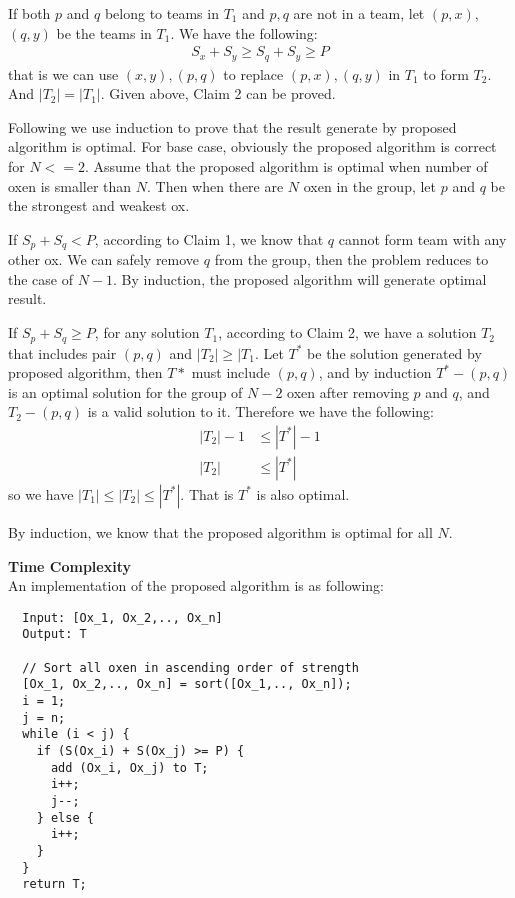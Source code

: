 \documentclass{article}
\newcommand{\Complexity}{\vspace{0.3cm} \noindent\textbf{Time Complexity} \\}
\begin{document}
If both $p$ and $q$ belong to teams in $T_1$ and $p, q$ are not in a team, let $(p, x)$, $(q, y)$ be
the teams in $T_1$. We have the following:
\begin{align}
  S_x + S_y \geq S_q + S_y \geq P 
\end{align}
that is we can use $(x, y), (p, q)$ to replace $(p, x), (q, y)$ in $T_1$ to form $T_2$. And $|T_2| =
|T_1|$.
Given above, Claim 2 can be proved.

\vspace{0.3cm}
Following we use induction to prove that the result generate by proposed algorithm is optimal.
For base case, obviously the proposed algorithm is correct for $N <= 2$.  
Assume that the proposed algorithm is optimal when number of oxen is smaller than $N$. Then when
there are $N$ oxen in the group, let $p$ and $q$ be the strongest and weakest ox.

If $S_p + S_q < P$, according to Claim 1, we know that $q$ cannot form team with any other ox. We
can safely remove $q$ from the group, then the problem reduces to the case of $N-1$. By induction,
the proposed algorithm will generate optimal result.

If $S_p + S_q \geq P$, for any solution $T_1$, according to Claim 2, we have a solution $T_2$ that
includes pair $(p, q)$ and $|T_2| \geq |T_1$. Let $T^*$ be the solution generated by proposed
algorithm, then $T*$ must include $(p, q)$, and by induction $T^* - (p, q)$ is an optimal solution for the group
of $N-2$ oxen after removing $p$ and $q$, and $T_2 - (p, q)$ is a valid solution to it. Therefore we
have the following:
\begin{align}
  |T_2| - 1 & \leq |T^*| - 1 \\
  |T_2| & \leq |T^*|
\end{align}
so we have $|T_1| \leq |T_2| \leq |T^*|$. That is $T^*$ is also optimal.

By induction, we know that the proposed algorithm is optimal for all $N$.

\Complexity
An implementation of the proposed algorithm is as following:
\begin{verbatim}
  Input: [Ox_1, Ox_2,.., Ox_n]
  Output: T
  
  // Sort all oxen in ascending order of strength
  [Ox_1, Ox_2,.., Ox_n] = sort([Ox_1,.., Ox_n]);
  i = 1;
  j = n;
  while (i < j) {
    if (S(Ox_i) + S(Ox_j) >= P) {
      add (Ox_i, Ox_j) to T;
      i++;
      j--;
    } else {
      i++;
    }
  }
  return T;
\end{verbatim}
\end{document}
